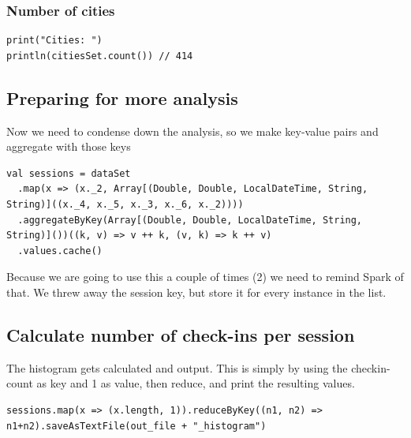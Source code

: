 \documentclass[abstract=on]{article}
\begin{document}
\subsubsection{Number of cities}
\begin{lstlisting}
print("Cities: ")
println(citiesSet.count()) // 414
\end{lstlisting}



\subsection{Preparing for more analysis}
Now we need to condense down the analysis, so we make key-value pairs and aggregate with those keys
\begin{lstlisting}
val sessions = dataSet
  .map(x => (x._2, Array[(Double, Double, LocalDateTime, String, String)]((x._4, x._5, x._3, x._6, x._2))))
  .aggregateByKey(Array[(Double, Double, LocalDateTime, String, String)]())((k, v) => v ++ k, (v, k) => k ++ v)
  .values.cache()
\end{lstlisting}
Because we are going to use this a couple of times (2) we need to remind Spark of that.
We threw away the session key, but store it for every instance in the list.


\subsection{Calculate number of check-ins per session}
The histogram gets calculated and output.
This is simply by using the checkin-count as key and 1 as value, then reduce, and print the resulting values.
\begin{lstlisting}
sessions.map(x => (x.length, 1)).reduceByKey((n1, n2) => n1+n2).saveAsTextFile(out_file + "_histogram")
\end{lstlisting}
\end{document}
